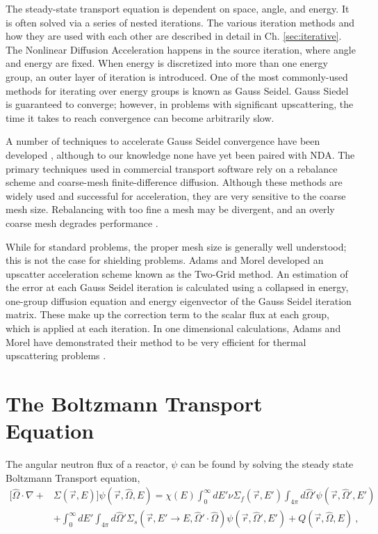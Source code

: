 The steady-state transport equation is dependent on space, angle, and energy. It is often solved via a series of nested iterations. The various iteration methods and how they are used with each other are described in detail in Ch. \ref{sec:iterative}. The Nonlinear Diffusion Acceleration happens in the source iteration, where angle and energy are fixed. When energy is discretized into more than one energy group, an outer layer of iteration is introduced. One of the most commonly-used methods for iterating over energy groups is known as Gauss Seidel. Gauss Siedel is guaranteed to converge; however, in problems with significant upscattering, the time it takes to reach convergence can become arbitrarily slow. 

A number of techniques to accelerate Gauss Seidel convergence have been developed \cite{morel-upscat} \cite{evans-upscat}, although to our knowledge none have yet been paired with NDA. The primary techniques used in commercial transport software rely on a rebalance scheme and coarse-mesh finite-difference diffusion.
Although these methods are widely used and successful for acceleration, they are very sensitive to the coarse mesh size. Rebalancing with too fine a mesh may be divergent, and an overly coarse mesh degrades performance \cite{evans-upscat}.

While for standard problems, the proper mesh size is generally well understood;
 this is not the case for shielding problems. Adams and Morel developed an upscatter acceleration scheme known as the Two-Grid method. An estimation of the error at each Gauss Seidel iteration is calculated using a collapsed in energy, one-group diffusion equation and energy eigenvector of the Gauss Seidel iteration matrix. These
  make up the correction term to the scalar flux at each group, which is applied at each iteration. In one dimensional calculations, Adams and Morel have demonstrated their method to be very efficient for thermal upscattering problems \cite{morel-upscat}.

\section{The Boltzmann Transport Equation}
The angular neutron flux of a reactor, $\psi$ can be found by solving the steady state Boltzmann Transport equation,
%
\begin{equation}
\begin{split}
 [\hat{\Omega} \cdot \nabla + &\Sigma(\vec{r}, E)]\psi(\vec{r}, \hat{\Omega}, E) = \chi(E) \int_0^\infty dE' \nu \Sigma_{f}(\vec{r}, E') \int_{4\pi} d\hat{\Omega}'\psi(\vec{r}, \hat{\Omega}', E') \\   &+ \int_0^\infty dE' \int_{4\pi} d\hat{\Omega}' \Sigma_s(\vec{r}, E' \rightarrow E, \hat{\Omega}' \cdot \hat{\Omega})\psi(\vec{r}, \hat{\Omega}', E') + Q(\vec{r}, \hat{\Omega}, E)   \:,
\end{split}
\label{eq:transport}
\end{equation}


